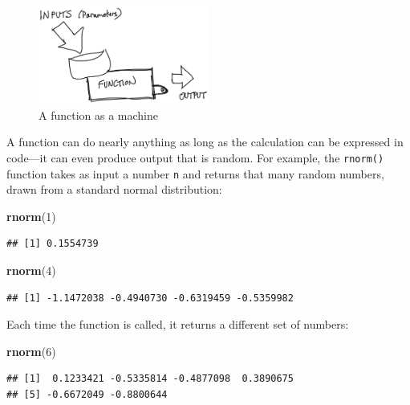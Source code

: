 \documentclass[
]{book}
\newenvironment{Shaded}{\begin{snugshade}}{\end{snugshade}}
\newcommand{\DecValTok}[1]{\textcolor[rgb]{0.00,0.00,0.81}{#1}}
\newcommand{\FunctionTok}[1]{\textcolor[rgb]{0.13,0.29,0.53}{\textbf{#1}}}
\newcommand{\NormalTok}[1]{#1}
\begin{document}
\begin{figure}
\centering
\includegraphics[width=0.5\textwidth,height=\textheight]{image/function-machine.png}
\caption{A function as a machine}
\end{figure}

A function can do nearly anything as long as the calculation can be expressed in code---it can even produce output that is random.
For example, the \texttt{rnorm()} function takes as input a number \texttt{n} and returns that many random numbers, drawn from a standard normal distribution:

\begin{Shaded}
\begin{Highlighting}[]
\FunctionTok{rnorm}\NormalTok{(}\DecValTok{1}\NormalTok{)}
\end{Highlighting}
\end{Shaded}

\begin{verbatim}
## [1] 0.1554739
\end{verbatim}

\begin{Shaded}
\begin{Highlighting}[]
\FunctionTok{rnorm}\NormalTok{(}\DecValTok{4}\NormalTok{)}
\end{Highlighting}
\end{Shaded}

\begin{verbatim}
## [1] -1.1472038 -0.4940730 -0.6319459 -0.5359982
\end{verbatim}

Each time the function is called, it returns a different set of numbers:

\begin{Shaded}
\begin{Highlighting}[]
\FunctionTok{rnorm}\NormalTok{(}\DecValTok{6}\NormalTok{)}
\end{Highlighting}
\end{Shaded}

\begin{verbatim}
## [1]  0.1233421 -0.5335814 -0.4877098  0.3890675
## [5] -0.6672049 -0.8800644
\end{verbatim}
\end{document}
